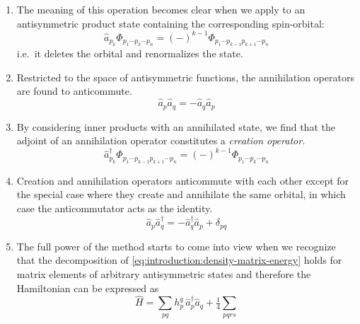 \begin{enumerate}
    \item
        The meaning of this operation becomes clear when we apply to an
        antisymmetric product state containing the corresponding spin-orbital:
        \begin{equation}
            \hat{a}_{p_k}
            \Phi_{p_1\cdots p_k \cdots p_n}
            =
            (-)^{k-1}
            \Phi_{p_1\cdots p_{k-1} p_{k+1}\cdots p_n}
        \end{equation}
        i.e.\ it deletes the orbital and renormalizes the state.
    \item
        Restricted to the space of antisymmetric functions, the annihilation
        operators are found to anticommute.
        \begin{equation}
            \hat{a}_p \hat{a}_q
            =
            -
            \hat{a}_q \hat{a}_p
        \end{equation}
    \item
        By considering inner products with an annihilated state, we find that
        the adjoint of an annihilation operator constitutes a {\itshape creation
        operator}.
        \begin{equation}
            \hat{a}_{p_k}^\dagger
            \Phi_{p_1\cdots p_{k-1} p_{k+1}\cdots p_n}
            =
            (-)^{k-1}
            \Phi_{p_1\cdots p_k\cdots p_n}
        \end{equation}
    \item
        Creation and annihilation operators anticommute with each other except
        for the special case where they create and annihilate the same orbital,
        in which case the anticommutator acts as the identity.
        \begin{equation}
            \hat{a}_p \hat{a}_q^\dagger
            =
            -
            \hat{a}_q^\dagger \hat{a}_p
            +
            \delta_{pq}
        \end{equation}
    \item
        The full power of the method starts to come into view when we recognize
        that the decomposition of \cref{eq:introduction:density-matrix-energy}
        holds for matrix elements of arbitrary antisymmetric states and
        therefore the Hamiltonian can be expressed as
        \begin{equation}
            \hat{H}
            =
            \sum_{pq}
            h_p^q\,
            \hat{a}_p^\dagger
            \hat{a}_q
            +
            \tfrac{1}{4}
            \sum_{pqrs}

\end{equation}
\end{enumerate}
